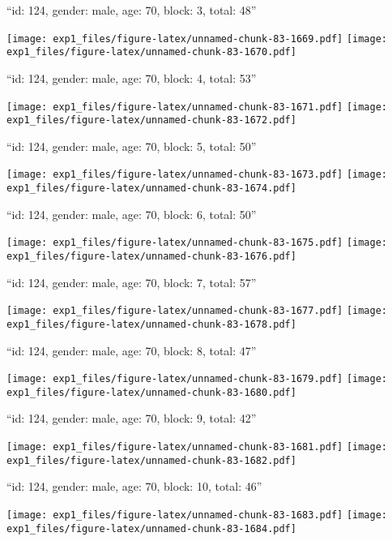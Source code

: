 \documentclass[11pt,,]{article}
\begin{document}
\newpage
[1] 

``id: 124, gender: male, age: 70, block: 3, total: 48''

\texttt{[image: exp1\_files/figure-latex/unnamed-chunk-83-1669.pdf]}
\texttt{[image: exp1\_files/figure-latex/unnamed-chunk-83-1670.pdf]}

\newpage
[1] 

``id: 124, gender: male, age: 70, block: 4, total: 53''

\texttt{[image: exp1\_files/figure-latex/unnamed-chunk-83-1671.pdf]}
\texttt{[image: exp1\_files/figure-latex/unnamed-chunk-83-1672.pdf]}

\newpage
[1] 

``id: 124, gender: male, age: 70, block: 5, total: 50''

\texttt{[image: exp1\_files/figure-latex/unnamed-chunk-83-1673.pdf]}
\texttt{[image: exp1\_files/figure-latex/unnamed-chunk-83-1674.pdf]}

\newpage
[1] 

``id: 124, gender: male, age: 70, block: 6, total: 50''

\texttt{[image: exp1\_files/figure-latex/unnamed-chunk-83-1675.pdf]}
\texttt{[image: exp1\_files/figure-latex/unnamed-chunk-83-1676.pdf]}

\newpage
[1] 

``id: 124, gender: male, age: 70, block: 7, total: 57''

\texttt{[image: exp1\_files/figure-latex/unnamed-chunk-83-1677.pdf]}
\texttt{[image: exp1\_files/figure-latex/unnamed-chunk-83-1678.pdf]}

\newpage
[1] 

``id: 124, gender: male, age: 70, block: 8, total: 47''

\texttt{[image: exp1\_files/figure-latex/unnamed-chunk-83-1679.pdf]}
\texttt{[image: exp1\_files/figure-latex/unnamed-chunk-83-1680.pdf]}

\newpage
[1] 

``id: 124, gender: male, age: 70, block: 9, total: 42''

\texttt{[image: exp1\_files/figure-latex/unnamed-chunk-83-1681.pdf]}
\texttt{[image: exp1\_files/figure-latex/unnamed-chunk-83-1682.pdf]}

\newpage
[1] 

``id: 124, gender: male, age: 70, block: 10, total: 46''

\texttt{[image: exp1\_files/figure-latex/unnamed-chunk-83-1683.pdf]}
\texttt{[image: exp1\_files/figure-latex/unnamed-chunk-83-1684.pdf]}
\end{document}
